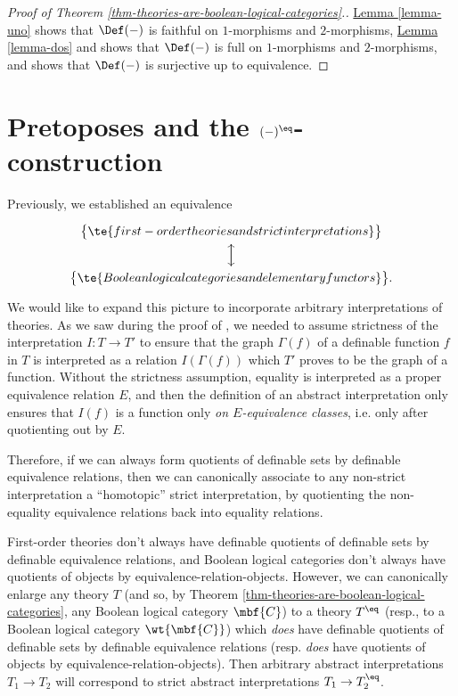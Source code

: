 \documentclass[11pt]{article}
\begin{document}
  \begin{proof}[Proof of Theorem \ref{thm-theories-are-boolean-logical-categories}.]
    \hyperref[lemma-uno]{Lemma \ref*{lemma-uno}} shows that $\Def(-)$ is faithful on $1$-morphisms and $2$-morphisms, \hyperref[lemma-dos]{Lemma \ref*{lemma-dos}} and  shows that $\Def(-)$ is full on $1$-morphisms and $2$-morphisms, and  shows that $\Def(-)$ is surjective up to equivalence.
  \end{proof}
\section{Pretoposes and the $(-)^{\eq}$-construction}
Previously, we established an equivalence
$$
\begin{tikzcd}[ampersand replacement = \&]
 \bigl\{\te{first-order theories and strict interpretations}\bigr\} \arrow{d}\\
 \bigl\{\te{Boolean logical categories and elementary functors}\bigr\}. \arrow{u}
\end{tikzcd}
$$
We would like to expand this picture to incorporate arbitrary interpretations of theories. As we saw during the proof of , we needed to assume strictness of the interpretation $I : T \to T'$ to ensure that the graph $\Gamma(f)$ of a definable function $f$ in $T$ is interpreted as a relation $I(\Gamma(f))$ which $T'$ proves to be the graph of a function. Without the strictness assumption, equality is interpreted as a proper equivalence relation $E$, and then the definition of an abstract interpretation only ensures that $I(f)$ is a function only \emph{on $E$-equivalence classes}, i.e. only after quotienting out by $E$.

Therefore, if we can always form quotients of definable sets by definable equivalence relations, then we can canonically associate to any non-strict interpretation a ``homotopic'' strict interpretation, by quotienting the non-equality equivalence relations back into equality relations.

First-order theories don't always have definable quotients of definable sets by definable equivalence relations, and Boolean logical categories don't always have quotients of objects by equivalence-relation-objects. However, we can canonically enlarge any theory $T$ (and so, by Theorem \ref{thm-theories-are-boolean-logical-categories}, any Boolean logical category $\mbf{C}$) to a theory $T^{\eq}$ (resp., to a Boolean logical category $\wt{\mbf{C}}$) which \emph{does} have definable quotients of definable sets by definable equivalence relations (resp. \emph{does} have quotients of objects by equivalence-relation-objects). Then arbitrary abstract interpretations $T_1 \to T_2$ will correspond to strict abstract interpretations $T_1 \to T_2^{\eq}$.
\end{document}
